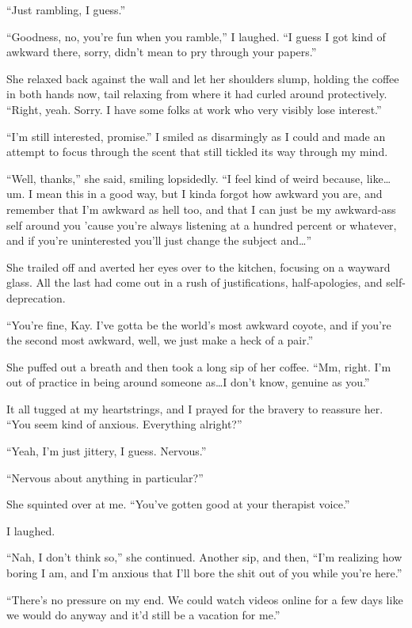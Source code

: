 ``Just rambling, I guess.''

``Goodness, no, you're fun when you ramble,'' I laughed. ``I guess I got kind of awkward there, sorry, didn't mean to pry through your papers.''

She relaxed back against the wall and let her shoulders slump, holding the coffee in both hands now, tail relaxing from where it had curled around protectively. ``Right, yeah. Sorry. I have some folks at work who very visibly lose interest.''

``I'm still interested, promise.'' I smiled as disarmingly as I could and made an attempt to focus through the scent that still tickled its way through my mind.

``Well, thanks,'' she said, smiling lopsidedly. ``I feel kind of weird because, like\ldots um. I mean this in a good way, but I kinda forgot how awkward you are, and remember that I'm awkward as hell too, and that I can just be my awkward-ass self around you 'cause you're always listening at a hundred percent or whatever, and if you're uninterested you'll just change the subject and\ldots{}''

She trailed off and averted her eyes over to the kitchen, focusing on a wayward glass. All the last had come out in a rush of justifications, half-apologies, and self-deprecation.

``You're fine, Kay. I've gotta be the world's most awkward coyote, and if you're the second most awkward, well, we just make a heck of a pair.''

She puffed out a breath and then took a long sip of her coffee. ``Mm, right. I'm out of practice in being around someone as\ldots I don't know, genuine as you.''

It all tugged at my heartstrings, and I prayed for the bravery to reassure her. ``You seem kind of anxious. Everything alright?''

``Yeah, I'm just jittery, I guess. Nervous.''

``Nervous about anything in particular?''

She squinted over at me. ``You've gotten good at your therapist voice.''

I laughed.

``Nah, I don't think so,'' she continued. Another sip, and then, ``I'm realizing how boring I am, and I'm anxious that I'll bore the shit out of you while you're here.''

``There's no pressure on my end. We could watch videos online for a few days like we would do anyway and it'd still be a vacation for me.''

